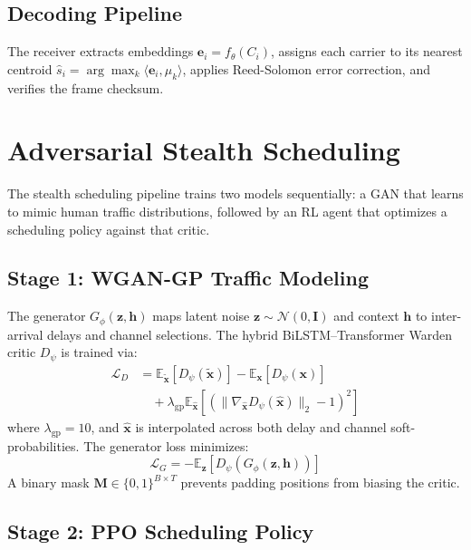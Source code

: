 \documentclass[conference]{IEEEtran}
\begin{document}
\subsection{Decoding Pipeline}
The receiver extracts embeddings $\mathbf{e}_i = f_{\theta}(C_i)$, assigns each carrier to its nearest centroid $\hat{s}_i = \arg\max_k \langle \mathbf{e}_i, \mu_k \rangle$, applies Reed-Solomon error correction, and verifies the frame checksum.

\section{Adversarial Stealth Scheduling}

The stealth scheduling pipeline trains two models sequentially: a GAN that learns to mimic human traffic distributions, followed by an RL agent that optimizes a scheduling policy against that critic.

\subsection{Stage 1: WGAN-GP Traffic Modeling}

The generator $G_{\phi}(\mathbf{z}, \mathbf{h})$ maps latent noise $\mathbf{z} \sim \mathcal{N}(0, \mathbf{I})$ and context $\mathbf{h}$ to inter-arrival delays and channel selections. The hybrid BiLSTM--Transformer Warden critic $D_{\psi}$ is trained via:
\begin{align}
\mathcal{L}_D &= \mathbb{E}_{\tilde{\mathbf{x}}}[D_{\psi}(\tilde{\mathbf{x}})] - \mathbb{E}_{\mathbf{x}}[D_{\psi}(\mathbf{x})] \nonumber \\
&\quad + \lambda_{\text{gp}} \mathbb{E}_{\hat{\mathbf{x}}}[(\|\nabla_{\hat{\mathbf{x}}} D_{\psi}(\hat{\mathbf{x}})\|_2 - 1)^2]
\end{align}
where $\lambda_{\text{gp}} = 10$, and $\hat{\mathbf{x}}$ is interpolated across both delay and channel soft-probabilities. The generator loss minimizes:
\begin{equation}
\mathcal{L}_G = -\mathbb{E}_{\mathbf{z}}[D_{\psi}(G_{\phi}(\mathbf{z}, \mathbf{h}))]
\end{equation}
A binary mask $\mathbf{M} \in \{0, 1\}^{B \times T}$ prevents padding positions from biasing the critic.

\subsection{Stage 2: PPO Scheduling Policy}
\end{document}

